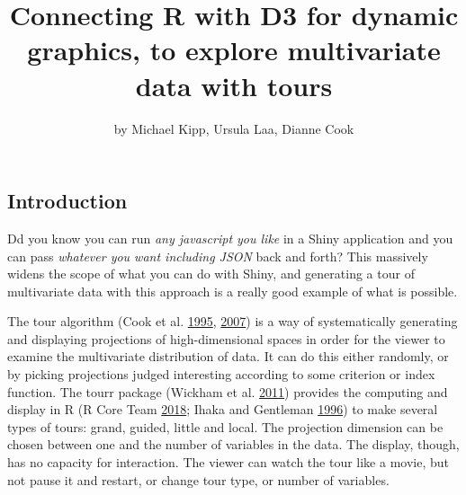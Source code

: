 \title{Connecting R with D3 for dynamic graphics, to explore multivariate data
with tours}
\author{by Michael Kipp, Ursula Laa, Dianne Cook}

\maketitle



\hypertarget{introduction}{%
\subsection{Introduction}\label{introduction}}

Dd you know you can run \emph{any javascript you like} in a Shiny
application and you can pass \emph{whatever you want including JSON}
back and forth? This massively widens the scope of what you can do with
Shiny, and generating a tour of multivariate data with this approach is
a really good example of what is possible.

The tour algorithm (Cook et al. \protect\hyperlink{ref-gt_pp}{1995},
\protect\hyperlink{ref-gt_pp_mc}{2007}) is a way of systematically
generating and displaying projections of high-dimensional spaces in
order for the viewer to examine the multivariate distribution of data.
It can do this either randomly, or by picking projections judged
interesting according to some criterion or index function. The tourr
package (Wickham et al. \protect\hyperlink{ref-tourr}{2011}) provides
the computing and display in R (R Core Team
\protect\hyperlink{ref-R}{2018}; Ihaka and Gentleman
\protect\hyperlink{ref-ihaka:1996}{1996}) to make several types of
tours: grand, guided, little and local. The projection dimension can be
chosen between one and the number of variables in the data. The display,
though, has no capacity for interaction. The viewer can watch the tour
like a movie, but not pause it and restart, or change tour type, or
number of variables.

